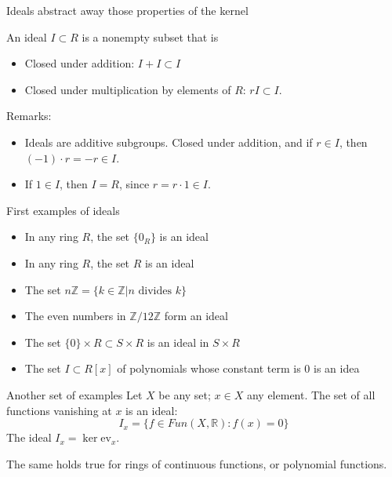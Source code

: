 \documentclass{beamer}
\begin{document}
\begin{frame}{Ideals abstract away those properties of the kernel}
\begin{definition}
An ideal $I\subset R$ is a nonempty subset that is

\begin{itemize}
\item Closed under addition: $I+I\subset I$
\item Closed under multiplication by elements of $R$: $rI\subset I$.
\end{itemize}
\end{definition}

\begin{block}{Remarks:}
\begin{itemize}
\item Ideals are additive subgroups.  Closed under addition, and if $r\in I$, then $(-1)\cdot r=-r\in I$.
\item If $1\in I$, then $I=R$, since $r=r\cdot 1\in I$.

\end{itemize}

\end{block}

\end{frame}


\begin{frame}{First examples of ideals}

\begin{itemize}
\item In any ring $R$, the set $\{0_R\}$ is an ideal
\item In any ring $R$, the set $R$ is an ideal
\item The set $n\mathbb{Z}=\{k\in \mathbb{Z} | n \textrm{ divides } k \}$
\item The even numbers in $\mathbb{Z}/12\mathbb{Z}$ form an ideal
\item The set $\{0\}\times R\subset S\times R$ is an ideal in $S\times R$
\item The set $I\subset R[x]$ of polynomials whose constant term is 0 is an idea
\end{itemize}
\end{frame}

\begin{frame}{Another set of examples}
Let $X$ be any set; $x\in X$ any element.  The set of all functions vanishing at $x$ is an ideal:
$$I_x=\{f\in Fun(X,\mathbb{R}): f(x)=0\}$$
The ideal $I_x=\ker{\textrm{ev}_{x}}$.

The same holds true for rings of continuous functions, or polynomial functions.


\end{frame}
\end{document}
